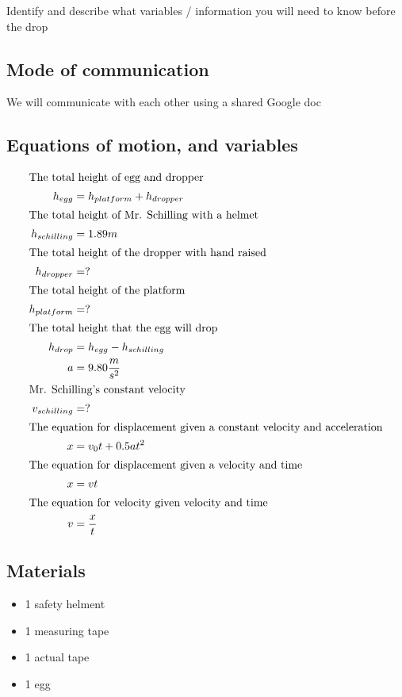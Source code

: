 \documentclass[12pt]{article}
\begin{document}
Identify and describe what variables / information you will need to know before the drop

\subsection{Mode of communication}

We will communicate with each other using a shared Google doc

\subsection{Equations of motion, and variables}

\begin{align*}
	\intertext{The total height of egg and dropper}
	h_{egg}       & =h_{platform}+h_{dropper} \\
	\intertext{The total height of Mr. Schilling with a helmet}
	h_{schilling} & =1.89m                    \\
	\intertext{The total height of the dropper with hand raised}
	h_{dropper}   & =?                        \\
	\intertext{The total height of the platform}
	h_{platform}  & =?                        \\
	\intertext{The total height that the egg will drop}
	h_{drop}      & =h_{egg}-h_{schilling}    \\
	a             & =9.80\frac{m}{s^2}        \\
	\intertext{Mr. Schilling's constant velocity}
	v_{schilling} & =?                        \\
	\intertext{The equation for displacement given a constant velocity and acceleration}
	x             & =v_{0}t+0.5at^{2}         \\
	\intertext{The equation for displacement given a velocity and time}
	x             & =vt                       \\
	\intertext{The equation for velocity given velocity and time}
	v             & =\frac{x}{t}              \\
\end{align*}


\subsection{Materials}

\begin{itemize}
	\item{1 safety helment}
	\item{1 measuring tape}
	\item{1 actual tape}
	\item{1 egg}
\end{itemize}
\end{document}
